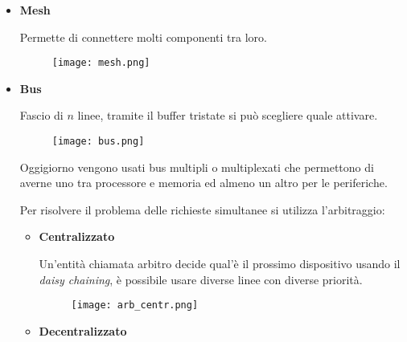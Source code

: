 \documentclass{article}
\begin{document}
\begin{itemize}
\begin{itemize}
            \newpage

            \item \textbf{Mesh}

                Permette di connettere molti componenti tra loro.

                        \begin{figure}[ht]
                        \centering
                        \texttt{[image: mesh.png]}
                        \label{fig:mesh}
                        \end{figure}

            \item \textbf{Bus}

                Fascio di $n$ linee, tramite il buffer tristate si può scegliere quale attivare.\newline

                        \begin{figure}[ht]
                        \centering
                        \texttt{[image: bus.png]}
                        \label{fig:bus}
                        \end{figure}

                Oggigiorno vengono usati bus multipli o multiplexati che permettono di averne uno tra processore e memoria ed almeno un altro per le periferiche.\newline

                \newpage

                Per risolvere il problema delle richieste simultanee si utilizza l'arbitraggio:
                \begin{itemize}
                    \item \textbf{Centralizzato}

                        Un'entità chiamata arbitro decide qual'è il prossimo dispositivo usando il \textit{daisy chaining}, è possibile usare diverse linee con diverse priorità.

                        \begin{figure}[ht]
                        \centering
                        \texttt{[image: arb\_centr.png]}
                        \label{fig:arb_centr}
                        \end{figure}                        

                    \item \textbf{Decentralizzato}


\end{itemize}
\end{itemize}
\end{itemize}
\end{document}
